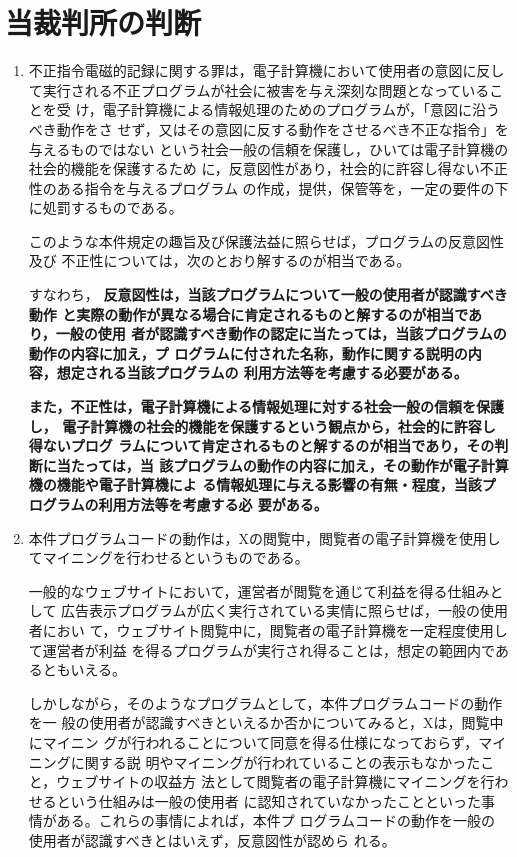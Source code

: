 \documentclass[12pt,a4paper]{ltjsarticle}
\begin{document}
 \section{当裁判所の判断}
 \begin{enumerate}
  \item 不正指令電磁的記録に関する罪は，電子計算機において使用者の意図に反し
        て実行される不正プログラムが社会に被害を与え深刻な問題となっていることを受
        け，電子計算機による情報処理のためのプログラムが，「意図に沿うべき動作をさ
        せず，又はその意図に反する動作をさせるべき不正な指令」を与えるものではない
        という社会一般の信頼を保護し，ひいては電子計算機の社会的機能を保護するため
        に，反意図性があり，社会的に許容し得ない不正性のある指令を与えるプログラム
        の作成，提供，保管等を，一定の要件の下に処罰するものである。

        このような本件規定の趣旨及び保護法益に照らせば，プログラムの反意図性及び
        不正性については，次のとおり解するのが相当である。

        すなわち，
        \textbf{反意図性は，当該プログラムについて一般の使用者が認識すべき動作
        と実際の動作が異なる場合に肯定されるものと解するのが相当であり，一般の使用
        者が認識すべき動作の認定に当たっては，当該プログラムの動作の内容に加え，プ
        ログラムに付された名称，動作に関する説明の内容，想定される当該プログラムの
        利用方法等を考慮する必要がある。}

        \textbf{また，不正性は，電子計算機による情報処理に対する社会一般の信頼を保護し，
        電子計算機の社会的機能を保護するという観点から，社会的に許容し得ないプログ
        ラムについて肯定されるものと解するのが相当であり，その判断に当たっては，当
        該プログラムの動作の内容に加え，その動作が電子計算機の機能や電子計算機によ
        る情報処理に与える影響の有無・程度，当該プログラムの利用方法等を考慮する必
        要がある。}

  \item 本件プログラムコードの動作は，Xの閲覧中，閲覧者の電子計算機を使用し
        てマイニングを行わせるというものである。

        一般的なウェブサイトにおいて，運営者が閲覧を通じて利益を得る仕組みとして
        広告表示プログラムが広く実行されている実情に照らせば，一般の使用者におい
        て，ウェブサイト閲覧中に，閲覧者の電子計算機を一定程度使用して運営者が利益
        を得るプログラムが実行され得ることは，想定の範囲内であるともいえる。

        しかしながら，そのようなプログラムとして，本件プログラムコードの動作を一
        般の使用者が認識すべきといえるか否かについてみると，Xは，閲覧中にマイニン
        グが行われることについて同意を得る仕様になっておらず，マイニングに関する説
        明やマイニングが行われていることの表示もなかったこと，ウェブサイトの収益方
        法として閲覧者の電子計算機にマイニングを行わせるという仕組みは一般の使用者
        に認知されていなかったことといった事情がある。これらの事情によれば，本件プ
        ログラムコードの動作を一般の使用者が認識すべきとはいえず，反意図性が認めら
        れる。


\end{enumerate}
\end{document}

